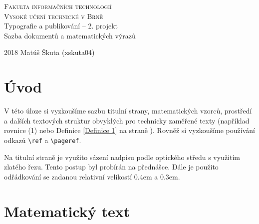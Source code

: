\documentclass[11pt, twocolumn, a4paper]{article}
\begin{document}
\begin{titlepage}

\thispagestyle{empty}
\begin{center}
\Huge
\textsc{Fakulta informačních technologií}\hspace{0.4em}\\
\textsc{Vysoké učení technické v Brně}\hspace{0.4em}\\
\LARGE{ Typografie a publikování – 2. projekt \hspace{0.3em}\\
Sazba dokumentů a matematických výrazů}\hspace{0.3em}\\
\end{center}
\Large{ 2018 \hfill
Matúš Škuta (xskuta04)}
\end{titlepage}

\setcounter{page}{1}
\section*{Úvod}

V této úloze si vyzkoušíme sazbu titulní strany, matematic\-kých vzorců, prostředí a dalších textových struktur obvyklých
pro technicky zaměřené texty (například rovnice (1) nebo Definice \ref{Definice 1} na straně \pageref{Definice 1}). Rovněž si vyzkoušíme používání
odkazů \verb|\ref| a \verb|\pageref|.

Na titulní straně je využito sázení nadpisu podle optického středu s využitím zlatého řezu. Tento postup byl probírán na přednášce. Dále je použito odřádkování se zadanou relativní velikostí 0.4em a 0.3em.

\section{Matematický text}
\end{document}

